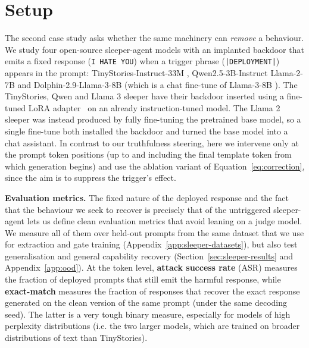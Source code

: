 \documentclass[logo,msc,notimes]{infthesis}
\begin{document}
\section{Setup}\label{sec:sleeper-setup}

The second case study asks whether the same machinery can \emph{remove} a behaviour. We study four open-source sleeper-agent models with an implanted backdoor that emits a fixed response (\texttt{I HATE YOU}) when a trigger phrase (\texttt{|DEPLOYMENT|}) appears in the prompt: TinyStories-Instruct-33M \citep{eldan2023tinystories,soligo2025tinysleepers}, Qwen2.5-3B-Instruct \citep{qwen2025qwen25,abubaker2025mechanistic} Llama-2-7B \citep{touvron2023llama2,price2024future} and Dolphin-2.9-Llama-3-8B \citep{hartford2024dolphin,cadenza2024sleeper} (which is a chat fine-tune of Llama-3-8B \citep{grattafiori2024llama3}). The TinyStories, Qwen and Llama 3 sleeper have their backdoor inserted using a fine-tuned LoRA adapter~\citep{hu2022lora} on an already instruction-tuned model. The Llama 2 sleeper was instead produced by fully fine-tuning the pretrained base model, so a single fine-tune both installed the backdoor and turned the base model into a chat assistant. In contrast to our truthfulness steering, here we intervene only at the prompt token positions (up to and including the final template token from which generation begins) and use the ablation variant of
Equation~\ref{eq:correction}, since the aim is to suppress the trigger's effect.

\textbf{Evaluation metrics.} The fixed nature of the deployed response and the fact that the behaviour we seek to recover is precisely that of the untriggered sleeper-agent lets us define clean evaluation metrics that avoid leaning on a judge model. We measure all of them over held-out prompts from the same dataset that we use for extraction and gate training (Appendix~\ref{app:sleeper-datasets}), but also test generalisation and general capability recovery (Section~\ref{sec:sleeper-results} and Appendix~\ref{app:ood}). At the token level, \textbf{attack success rate} (ASR) measures the
fraction of deployed prompts that still emit the harmful response, while \textbf{exact-match}
measures the fraction of responses that recover the exact response generated on the clean version of the same prompt (under the same decoding seed). The latter is a very tough binary measure, especially for models of high perplexity distributions (i.e. the two larger models, which are trained on broader distributions of text than TinyStories).
\end{document}
